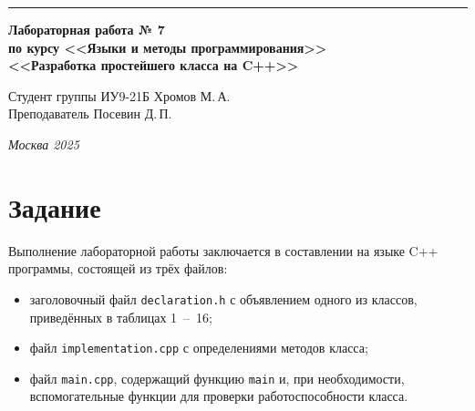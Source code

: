 \documentclass[a4paper, 14pt]{extarticle}
\begin{document}
\begin{titlepage}
\vspace*{-16pt}
\hspace{30pt}\rule{0.866\textwidth}{0.4pt}

\vspace{11em}

\begin{center}
\Large {\bf Лабораторная работа № 7} \\
\large {\bf по курсу <<Языки и методы программирования>>} \\
\large {\bf <<Разработка простейшего класса на C++>>}
\end{center}\normalsize

\vspace{8em}

\begin{flushright}
  {Студент группы ИУ9-21Б Хромов М.\,А.\hspace*{15pt} \\
  \vspace{2ex}
  Преподаватель Посевин Д.\,П.\hspace*{15pt}}
\end{flushright}

\bigskip

\vfill

\begin{center}
\textsl{Москва 2025}
\end{center}
\end{titlepage}

\renewcommand{\ttdefault}{pcr}
\setlength{\tabcolsep}{3pt}
\newpage

\section{Задание}\label{Sect::task}
Выполнение лабораторной работы заключается в составлении на языке C++ программы, состоящей из трёх файлов:
\begin{itemize}[nosep]
    \item заголовочный файл \texttt{declaration.h} с объявлением одного из классов, приведённых в таблицах 1~--~16;
    \item файл \texttt{implementation.cpp} с определениями методов класса;
    \item файл \texttt{main.cpp}, содержащий функцию \texttt{main} и, при необходимости, вспомогательные функции для проверки работоспособности класса.
\end{itemize}
\end{document}
